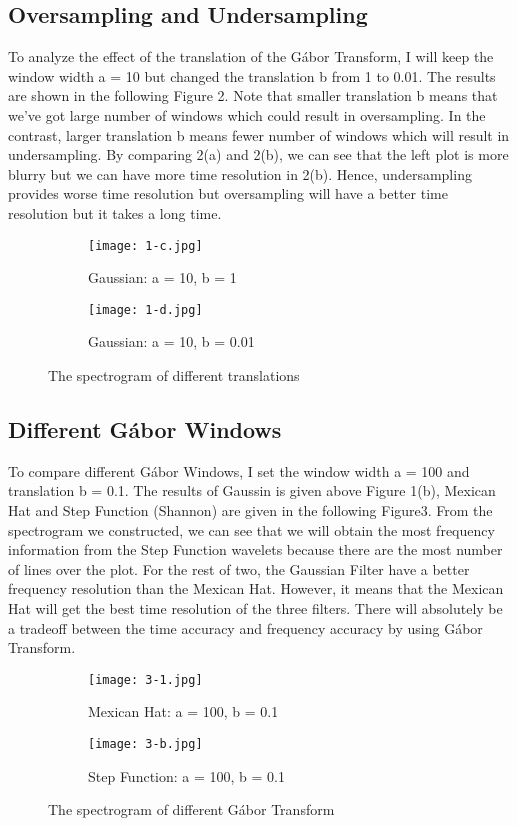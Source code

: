 \documentclass[12pt,letterpaper]{article}
\begin{document}
\subsection*{Oversampling and Undersampling}
To analyze the effect of the translation of the G\'abor Transform, I will keep the window width a = 10 but changed the translation b from 1 to 0.01. The results are shown in the following Figure 2. Note that smaller translation b means that we've got large number of windows which could result in oversampling. In the contrast, larger translation b means fewer number of windows which will result in undersampling. By comparing 2(a) and 2(b), we can see that the left plot is more blurry but we can have more time resolution in 2(b). Hence, undersampling provides worse time resolution but oversampling will have a better time resolution but it takes a long time. 
\begin{figure}[ht]
\begin{subfigure}{.5\textwidth}
  \centering
  \texttt{[image: 1-c.jpg]}  
  \caption{Gaussian: a = 10, b = 1}
  \label{fig:sub-first}
\end{subfigure}
\begin{subfigure}{.5\textwidth}
  \centering
  \texttt{[image: 1-d.jpg]}  
  \caption{Gaussian: a = 10, b = 0.01}
  \label{fig:sub-second}
\end{subfigure}
\label{fig:fig}
\caption{The spectrogram of different translations}
\end{figure}

\subsection*{Different G\'abor Windows}
To compare different G\'abor Windows, I set the window width a = 100 and translation b = 0.1. The results of Gaussin is given above Figure 1(b), Mexican Hat and Step Function (Shannon) are given in the following Figure3. From the spectrogram we constructed, we can see that we will obtain the most frequency information from the Step Function wavelets because there are the most number of lines over the plot. For the rest of two, the Gaussian Filter have a better frequency resolution than the Mexican Hat. However, it means that the Mexican Hat will get the best time resolution of the three filters. There will absolutely be a tradeoff between the time accuracy and frequency accuracy by using G\'abor Transform. 
\begin{figure}[ht]
\begin{subfigure}{.5\textwidth}
  \centering
  \texttt{[image: 3-1.jpg]}  
  \caption{Mexican Hat: a = 100, b = 0.1}
  \label{fig:sub-first}
\end{subfigure}
\begin{subfigure}{.5\textwidth}
  \centering
  \texttt{[image: 3-b.jpg]}  
  \caption{Step Function: a = 100, b = 0.1}
  \label{fig:sub-second}
\end{subfigure}
\label{fig:fig}
\caption{The spectrogram of different G\'abor Transform}
\end{figure}
\newpage
\end{document}
